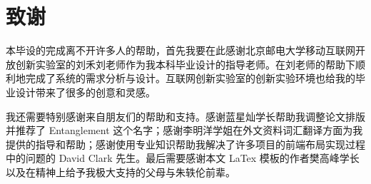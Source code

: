 \chapter*{致\qquad 谢}
\songti{}

本毕设的完成离不开许多人的帮助，首先我要在此感谢北京邮电大学移动互联网开放创新实验室的刘禾刘老师作为我本科毕业设计的指导老师。在刘老师的帮助下顺利地完成了系统的需求分析与设计。互联网创新实验室的创新实验环境也给我的毕业设计带来了很多的创意和灵感。

我还需要特别感谢来自朋友们的帮助和支持。感谢蓝星灿学长帮助我调整论文排版并推荐了 Entanglement 这个名字；感谢李明洋学姐在外文资料词汇翻译方面为我提供的指导和帮助；感谢使用专业知识帮助我解决了许多项目的前端布局实现过程中的问题的 David Clark 先生。最后需要感谢本文 LaTex 模板的作者樊高峰学长以及在精神上给予我极大支持的父母与朱轶伦前辈。

